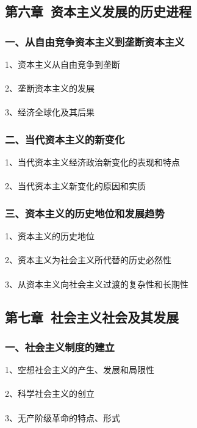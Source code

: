 \documentclass{ctexart}
\begin{document}
\subsection{第六章\ 资本主义发展的历史进程}
\subsubsection{一、从自由竞争资本主义到垄断资本主义}
1、资本主义从自由竞争到垄断
\\\\

2、垄断资本主义的发展
\\\\

3、经济全球化及其后果

\subsubsection{二、当代资本主义的新变化}
1、当代资本主义经济政治新变化的表现和特点
\\\\

2、当代资本主义新变化的原因和实质

\subsubsection{三、资本主义的历史地位和发展趋势}
1、资本主义的历史地位
\\\\

2、资本主义为社会主义所代替的历史必然性
\\\\

3、从资本主义向社会主义过渡的复杂性和长期性

\subsection{第七章\ 社会主义社会及其发展}
\subsubsection{一、社会主义制度的建立}
1、空想社会主义的产生、发展和局限性
\\\\

2、科学社会主义的创立
\\\\

3、无产阶级革命的特点、形式
\\\\
\end{document}
